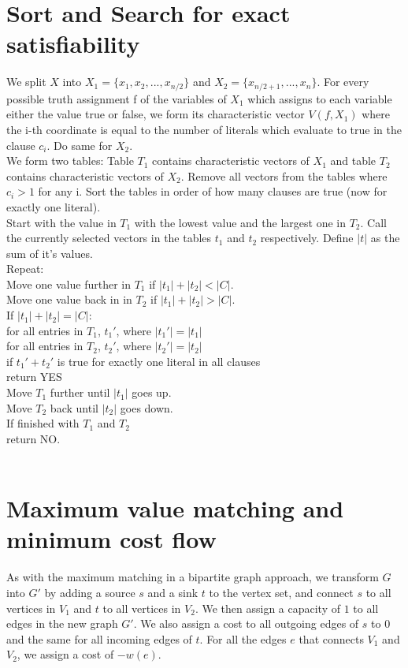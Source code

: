 \documentclass[a4paper]{article}
\begin{document}
\section{Sort and Search for exact satisfiability }
We split $X$ into $X_1 = \{x_1, x_2, ... ,x_{n/2}\}$ and $X_2 = \{x_{n/2+1}, ... ,x_{n}\}$. For every possible truth assignment
f of the variables of $X_1$ which assigns to each variable either the value true or false, we form its characteristic vector $V(f,X_1)$ where the i-th coordinate is equal to the number of literals which evaluate to true in the clause $c_i$. Do same for $X_2$.\\
We form two tables: Table $T_1$ contains characteristic vectors of $X_1$ and table $T_2$ contains characteristic vectors of $X_2$. Remove all vectors from the tables where $c_i > 1$ for any i. Sort the tables in order of how many clauses are true (now for exactly one literal).\\
Start with the value in $T_1$ with the lowest value and the largest one in $T_2$. Call the currently selected vectors in the tables $t_1$ and $t_2$ respectively. Define $|t|$ as the sum of it's values.\\
Repeat:\\
Move one value further in $T_1$ if $|t_1|+|t_2|<|C|$. \\
Move one value back in in $T_2$ if $|t_1|+|t_2|>|C|$. \\
If $|t_1|+|t_2|=|C|$:\\
\indent for all entries in $T_1$, $t_1'$, where $|t_1'| = |t_1|$\\
\indent \indent for all entries in $T_2$, $t_2'$, where $|t_2'| = |t_2|$\\
\indent \indent \indent if $t_1' + t_2'$ is true for exactly one literal in all clauses\\
\indent \indent \indent \indent return YES\\
\indent Move $T_1$ further until $|t_1|$ goes up.\\
\indent Move $T_2$ back until $|t_2|$ goes down.\\
If finished with $T_1$ and $T_2$\\
\indent return NO.\\
\\


\section{Maximum value matching and minimum cost flow}
As with the maximum matching in a bipartite graph approach, we transform $G$ into $G'$ by adding a source $s$ and a sink $t$ to the vertex set, and connect $s$ to all vertices in $V_1$ and $t$ to all vertices in $V_2$. We then assign a capacity of $1$ to all edges in the new graph $G'$. We also assign a cost to all outgoing edges of $s$ to $0$ and the same for all incoming edges of $t$. For all the edges $e$ that connects $V_1$ and $V_2$, we assign a cost of $-w(e)$.
\end{document}
